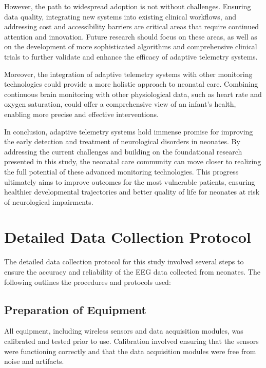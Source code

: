 \documentclass[12pt,journal,compsoc]{IEEEtran}
\begin{document}
However, the path to widespread adoption is not without challenges. Ensuring data quality, integrating new systems into existing clinical workflows, and addressing cost and accessibility barriers are critical areas that require continued attention and innovation. Future research should focus on these areas, as well as on the development of more sophisticated algorithms and comprehensive clinical trials to further validate and enhance the efficacy of adaptive telemetry systems.

Moreover, the integration of adaptive telemetry systems with other monitoring technologies could provide a more holistic approach to neonatal care. Combining continuous brain monitoring with other physiological data, such as heart rate and oxygen saturation, could offer a comprehensive view of an infant's health, enabling more precise and effective interventions.

In conclusion, adaptive telemetry systems hold immense promise for improving the early detection and treatment of neurological disorders in neonates. By addressing the current challenges and building on the foundational research presented in this study, the neonatal care community can move closer to realizing the full potential of these advanced monitoring technologies. This progress ultimately aims to improve outcomes for the most vulnerable patients, ensuring healthier developmental trajectories and better quality of life for neonates at risk of neurological impairments.

\appendices
\section{Detailed Data Collection Protocol}
The detailed data collection protocol for this study involved several steps to ensure the accuracy and reliability of the EEG data collected from neonates. The following outlines the procedures and protocols used:

\subsection{Preparation of Equipment}
All equipment, including wireless sensors and data acquisition modules, was calibrated and tested prior to use. Calibration involved ensuring that the sensors were functioning correctly and that the data acquisition modules were free from noise and artifacts.
\end{document}
